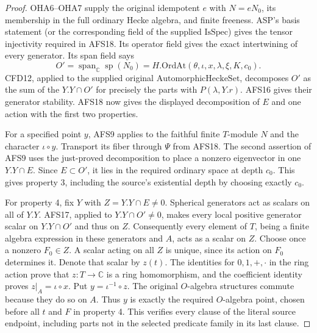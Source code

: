 \begin{proof}
OHA6--OHA7 supply the original idempotent $e$ with
$N=eN_0$, its membership in the full ordinary Hecke
algebra, and finite freeness.  ASP's basis statement
(or the corresponding field of the supplied
$\mathrm{IsSpec}$) gives the tensor injectivity required
in AFS18.  Its operator field gives the exact
intertwining of every generator.  Its span field says
\[
 O'=\operatorname{span}_{\mathbb C}\operatorname{sp}(N_0)
         =H.\mathrm{OrdAt}(\theta,\iota,x,\lambda,\xi,K,c_0).
\]
CFD12, applied to the supplied original
$\mathrm{AutomorphicHeckeSet}$, decomposes $O'$ as the
sum of the $Y.Y\cap O'$ for precisely the parts with
$P(\lambda,Y.r)$.  AFS16 gives their generator stability.
AFS18 now gives the displayed decomposition of $E$ and
one action with the first two properties.

For a specified point $y$, AFS9 applies to the faithful
finite $T$-module $N$ and the character $\iota\circ y$.
Transport its fiber through $\Psi$ from AFS18.  The
second assertion of AFS9 uses the just-proved decomposition
to place a nonzero eigenvector in one $Y.Y\cap E$.
Since $E\subset O'$, it lies in the required ordinary
space at depth $c_0$.  This gives property 3, including
the source's existential depth by choosing exactly $c_0$.

For property 4, fix $Y$ with $Z=Y.Y\cap E\ne0$.
Spherical generators act as scalars on all of $Y.Y$.
AFS17, applied to $Y.Y\cap O'\ne0$, makes every local
positive generator scalar on $Y.Y\cap O'$ and thus on
$Z$.  Consequently every element of $T$, being a
finite algebra expression in these generators and
$A$, acts as a scalar on $Z$.  Choose once a nonzero
$F_0\in Z$.  A scalar acting on all $Z$ is unique, since
its action on $F_0$ determines it.  Denote that scalar
by $z(t)$.  The identities for $0,1,+,\cdot$ in the
ring action prove that $z:T\to\mathbb C$ is a ring
homomorphism, and the coefficient identity proves
$z|_A=\iota\circ x$.  Put $y=\iota^{-1}\circ z$.
The original $O$-algebra structures commute because
they do so on $A$.  Thus $y$ is exactly the required
$O$-algebra point, chosen before all $t$ and $F$ in
property 4.  This verifies every clause of the literal
source endpoint, including parts not in the selected
predicate family in its last clause.
\end{proof}

